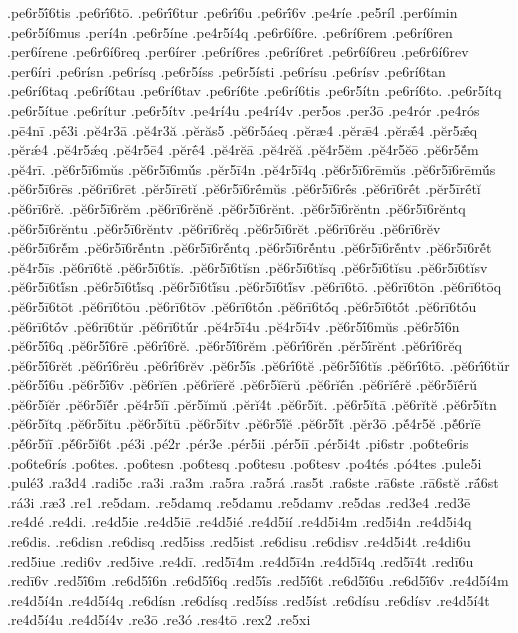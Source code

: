 {.pe6r5ī́6tis
.pe6rī́6tō.
.pe6rī́6tur
.pe6rī́6u
.pe6rī́6v
.pe4ríe
.pe5ríl
.per6ímin
.pe6r5í6mus
.perí4n
.pe6r5íne
.pe4r5í4q
.pe6r6í6re.
.pe6rí6rem
.pe6rí6ren
.per6írene
.pe6r6í6req
.per6írer
.pe6rí6res
.pe6rí6ret
.pe6r6í6reu
.pe6r6í6rev
.per6íri
.pe6rísn
.pe6rísq
.pe6r5íss
.pe6r5ísti
.pe6rísu
.pe6rísv
.pe6rí6tan
.pe6rí6taq
.pe6rí6tau
.pe6rí6tav
.pe6rí6te
.pe6rí6tis
.pe6r5ítn
.pe6rí6to.
.pe6r5ítq
.pe6r5ítue
.pe6rítur
.pe6r5ítv
.pe4rí4u
.pe4rí4v
.per5os
.per3ō
.pe4rór
.pe4rós
.pē4nī
.pḗ3i
.pĕ4r3ā
.pĕ4r3ă
.pĕrăs5
.pĕ6r5áeq
.pĕræ4
.pĕrǣ4
.pĕrǣ́4
.pĕr5ǣ́q
.pĕrǽ4
.pĕ4r5ǽq
.pĕ4r5ē4
.pĕrḗ4
.pĕ4rĕā
.pĕ4rĕă
.pĕ4r5ĕm
.pĕ4r5ĕō
.pĕ6r5ĕ́m
.pĕ4rī.
.pĕ6r5ī6mŭs
.pĕ6r5ī6mŭ́s
.pĕr5ī4n
.pĕ4r5ī4q
.pĕ6r5ī6rēmŭs
.pĕ6r5ī6rēmŭ́s
.pĕ6r5ī6rēs
.pĕ6rī6rēt
.pĕr5īrētĭ
.pĕ6r5ī6rḗmŭs
.pĕ6r5ī6rḗs
.pĕ6rī6rḗt
.pĕr5īrḗtĭ
.pĕ6rī6rĕ.
.pĕ6r5ī6rĕm
.pĕ6rī6rĕnĕ
.pĕ6r5ī6rĕnt.
.pĕ6r5ī6rĕntn
.pĕ6r5ī6rĕntq
.pĕ6r5ī6rĕntu
.pĕ6r5ī6rĕntv
.pĕ6rī6rĕq
.pĕ6r5ī6rĕt
.pĕ6rī6rĕu
.pĕ6rī6rĕv
.pĕ6r5ī6rĕ́m
.pĕ6r5ī6rĕ́ntn
.pĕ6r5ī6rĕ́ntq
.pĕ6r5ī6rĕ́ntu
.pĕ6r5ī6rĕ́ntv
.pĕ6r5ī6rĕ́t
.pĕ4r5īs
.pĕ6rī6tĕ
.pĕ6r5ī6tĭs.
.pĕ6r5ī6tĭsn
.pĕ6r5ī6tĭsq
.pĕ6r5ī6tĭsu
.pĕ6r5ī6tĭsv
.pĕ6r5ī6tĭ́sn
.pĕ6r5ī6tĭ́sq
.pĕ6r5ī6tĭ́su
.pĕ6r5ī6tĭ́sv
.pĕ6rī6tō.
.pĕ6rī6tōn
.pĕ6rī6tōq
.pĕ6r5ī6tōt
.pĕ6rī6tōu
.pĕ6rī6tōv
.pĕ6rī6tṓn
.pĕ6rī6tṓq
.pĕ6r5ī6tṓt
.pĕ6rī6tṓu
.pĕ6rī6tṓv
.pĕ6rī6tŭr
.pĕ6rī6tŭ́r
.pĕ4r5ī4u
.pĕ4r5ī4v
.pĕ6r5ī́6mŭs
.pĕ6r5ī́6n
.pĕ6r5ī́6q
.pĕ6r5ī́6rē
.pĕ6rī́6rĕ.
.pĕ6r5ī́6rĕm
.pĕ6rī́6rĕn
.pĕr5ī́rĕnt
.pĕ6rī́6rĕq
.pĕ6r5ī́6rĕt
.pĕ6rī́6rĕu
.pĕ6rī́6rĕv
.pĕ6r5ī́s
.pĕ6rī́6tĕ
.pĕ6r5ī́6tĭs
.pĕ6rī́6tō.
.pĕ6rī́6tŭr
.pĕ6r5ī́6u
.pĕ6r5ī́6v
.pĕ6rĭēn
.pĕ6rĭērĕ
.pĕ6r5ĭērŭ
.pĕ6rĭḗn
.pĕ6rĭḗrĕ
.pĕ6r5ĭḗrŭ
.pĕ6r5ĭĕr
.pĕ6r5ĭĕ́r
.pĕ4r5ĭī
.pĕr5ĭmŭ
.pĕrĭ4t
.pĕ6r5ĭt.
.pĕ6r5ĭtā
.pĕ6rĭtĕ
.pĕ6r5ĭtn
.pĕ6r5ĭtq
.pĕ6r5ĭtu
.pĕ6r5ĭtū
.pĕ6r5ĭtv
.pĕ6r5ĭ́ĕ
.pĕ6r5ĭ́t
.pĕr3ō
.pĕ́4r5ĕ
.pĕ́6rĭē
.pĕ́6r5ĭī
.pĕ́6r5ĭ6t
.pé3i
.pé2r
.pér3e
.pér5ii
.pér5iī
.pér5i4t
.pi6str
.po6te6ris
.po6te6rís
.po6tes.
.po6tesn
.po6tesq
.po6tesu
.po6tesv
.po4tés
.pó4tes
.pule5i
.pulé3
.ra3d4
.radi5c
.ra3i
.ra3m
.ra5ra
.ra5rá
.ras5t
.ra6ste
.rā6ste
.rā6stĕ
.rā́6st
.rá3i
.ræ3
.re1
.re5dam.
.re5damq
.re5damu
.re5damv
.re5das
.red3e4
.red3ē
.re4dé
.re4di.
.re4d5ie
.re4d5iē
.re4d5ié
.re4d5ií
.re4d5i4m
.red5i4n
.re4d5i4q
.re6dis.
.re6disn
.re6disq
.red5iss
.red5ist
.re6disu
.re6disv
.re4d5i4t
.re4di6u
.red5iue
.redi6v
.red5ive
.re4dī.
.red5ī4m
.re4d5ī4n
.re4d5ī4q
.red5ī4t
.redī6u
.redī6v
.red5ī́6m
.re6d5ī́6n
.re6d5ī́6q
.red5ī́s
.red5ī́6t
.re6d5ī́6u
.re6d5ī́6v
.re4d5í4m
.re4d5í4n
.re4d5í4q
.re6dísn
.re6dísq
.red5íss
.red5íst
.re6dísu
.re6dísv
.re4d5í4t
.re4d5í4u
.re4d5í4v
.re3ō
.re3ó
.res4tō
.rex2
.re5xi
}

